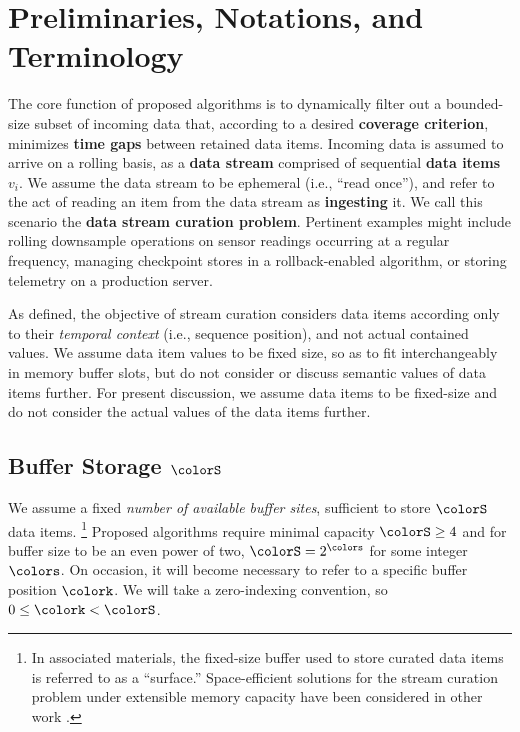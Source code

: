 \section{Preliminaries, Notations, and Terminology} \label{sec:notation}



The core function of proposed algorithms is to dynamically filter out a bounded-size subset of incoming data that, according to a desired \textbf{coverage criterion}, minimizes \textbf{time gaps} between retained data items.
Incoming data is assumed to arrive on a rolling basis, as a \textbf{data stream} comprised of sequential \textbf{data items} $v_i$.
We assume the data stream to be ephemeral (i.e., ``read once''), and refer to the act of reading an item from the data stream as \textbf{ingesting} it.
We call this scenario the \textbf{data stream curation problem}.
Pertinent examples might include rolling downsample operations on sensor readings occurring at a regular frequency, managing checkpoint stores in a rollback-enabled algorithm, or storing telemetry on a production server.

As defined, the objective of stream curation considers data items according only to their \textit{temporal context} (i.e., sequence position), and not actual contained values.
We assume data item values to be fixed size, so as to fit interchangeably in memory buffer slots, but do not consider or discuss semantic values of data items further.
For present discussion, we assume data items to be fixed-size and do not consider the actual values of the data items further.

\subsection{Buffer Storage $\colorS$}
\label{sec:notation-buffer}

We assume a fixed \textit{number of available buffer sites}, sufficient to store $\colorS$ data items.%
\footnote{%
In associated materials, the fixed-size buffer used to store curated data items is referred to as a ``surface.''
Space-efficient solutions for the stream curation problem under extensible memory capacity have been considered in other work \citep{moreno2024algorithms}.%
}
Proposed algorithms require minimal capacity $\colorS\geq4$ and for buffer size to be an even power of two, $\colorS = 2^{\colors}$ for some integer $\colors$.
On occasion, it will become necessary to refer to a specific buffer position $\colork$.
We will take a zero-indexing convention, so $0 \leq \colork < \colorS$.

